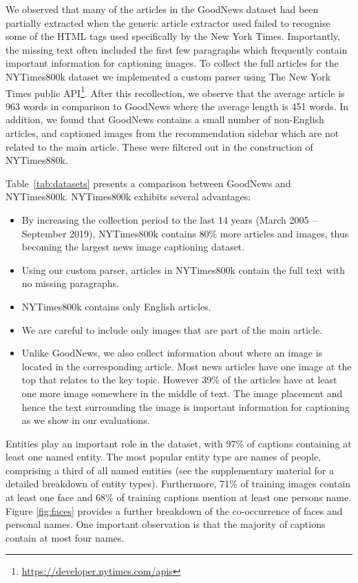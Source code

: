 We observed that many of the articles in the GoodNews dataset had
been partially extracted when the generic article extractor used
failed to recognise some of the HTML tags used
specifically by the New York Times. Importantly, the missing text often
included the first few
paragraphs
which frequently contain important information for captioning images. To
collect the full articles for the NYTimes800k dataset we
implemented a custom parser using The New York Times public
API\footnote{\href{https://developer.nytimes.com/apis}{https://developer.nytimes.com/apis}}.
After this recollection, we observe that the average article is 963 words in
comparison to GoodNews where the average length is 451 words. In addition, we
found that GoodNews contains a
small number of non-English articles, and captioned images from the
recommendation sidebar which are not related to the main article. These were
filtered out in the construction of NYTimes880k.


Table~\ref{tab:datasets} presents a comparison between GoodNews and
NYTimes800k. NYTimes800k exhibits several advantages:

\begin{itemize}
   \item By increasing the collection period to the last 14 years (March 2005
   -- September 2019), NYTimes800k contains 80\% more articles and images, thus
   becoming the largest news image captioning dataset.
   \item Using our custom parser, articles in NYTimes800k contain the full text
   with no missing paragraphs.
   \item NYTimes800k contains only English articles.
   \item We are careful to include only images that are part of the main
   article.
   \item Unlike GoodNews, we also collect information about where an image is
   located in the corresponding article. Most news articles have one image at
   the top that relates to the key topic. However 39\% of the articles have at
   least one more image somewhere in the middle of text. The image placement
   and hence the text surrounding the image is important information for
   captioning as we show in our evaluations.
\end{itemize}

Entities play an important role in the dataset, with 97\% of captions
containing at least one named entity.
The most popular entity type are names of people, comprising a third of all
named entities (see the supplementary material for a detailed breakdown of entity types). Furthermore, 71\% of training images contain at least one face
and 68\% of training captions mention at least one persons name. Figure
\ref{fig:faces} provides a further breakdown of the co-occurrence of faces and
personal names. One important observation is that the majority of captions
contain at most four names.


